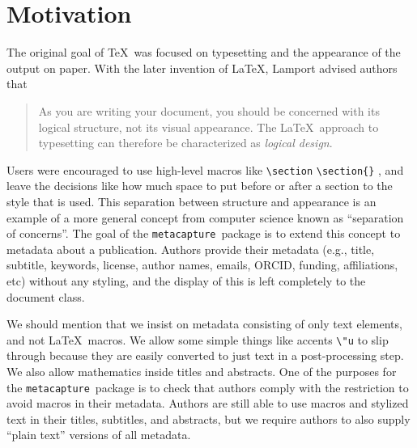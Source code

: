 \documentclass{article}
\newcommand{\pkgname}{\texttt{metacapture}}
\newcommand{\cmd}[2][]{%
  \def\FirstArg{#1}%
  \ifx\FirstArg\empty%
    \texttt{\textbackslash{}#2}%
  \else%
    \texttt{\textbackslash{}#2\{#1\}}%
  \fi
}
\begin{document}
\section{Motivation}
The original goal of \TeX\ was focused on typesetting and
the appearance of the output on paper. With the later invention of
\LaTeX, Lamport advised authors that
\begin{quote}As you are writing your document, you should be concerned with its logical
structure, not its visual appearance. The \LaTeX\ approach to typesetting
can therefore be characterized as \emph{logical design}.~\cite[\S 1.4]{latex}
\end{quote}
Users were encouraged to use high-level macros like \cmd{section}, and
leave the decisions like how much space to put before or after a
section to the style that is used.  This separation between structure
and appearance is an example of a more general concept from computer
science known as ``separation of concerns''. The goal of the \pkgname\
package is to extend this concept to metadata about a publication.
Authors provide their metadata (e.g., title, subtitle, keywords,
license, author names, emails, ORCID, funding, affiliations, etc)
without any styling, and the display of this is left completely to the
document class.

We should mention that we insist on metadata consisting of only text
elements, and not \LaTeX\ macros. We allow some simple things like
accents \verb+\"u+ to slip through because they are easily converted
to just text in a post-processing step. We also allow mathematics
inside titles and abstracts. One of the purposes for the \pkgname\
package is to check that authors comply with the restriction to avoid
macros in their metadata. Authors are still able to use macros and
stylized text in their titles, subtitles, and abstracts, but we
require authors to also supply ``plain text'' versions of all
metadata.
\end{document}
